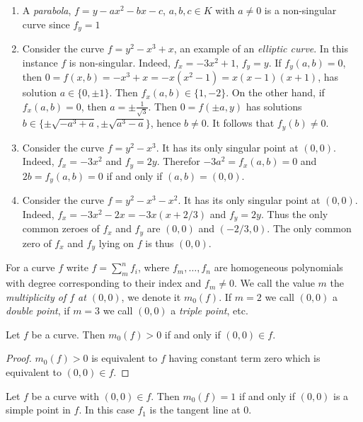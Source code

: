     \begin{example}
        \begin{enumerate}
            Each of the described curves will be in an algebraically closed field of characteristic $0$ (think $\C$).
            \item A \textit{parabola}, $f=y-ax^2-bx-c$, $a,b,c\in K$ with $a\neq 0$ is a non-singular curve since $f_y = 1$
            \item Consider the curve $f = y^2-x^3+x$, an example of an \textit{elliptic curve}. In this instance $f$ is non-singular. Indeed, $f_x = -3x^2+1$, $f_y = y$. If $f_y(a,b) = 0$, then $0=f(x,b)=-x^3+x=-x(x^2-1)=x(x-1)(x+1)$, has solution $a\in\{0,\pm 1\}$. Then $f_x(a,b)\in \{1,-2\}$. On the other hand, if $f_x(a,b)=0$, then $a=\pm \frac{1}{\sqrt{3}}$. Then $0=f(\pm a,y)$ has solutions $b\in \{\pm \sqrt{-a^3+a},\pm \sqrt{a^3-a}\}$, hence $b\neq 0$. It follows that $f_y(b)\neq 0$.
            \item Consider the curve $f = y^2-x^3$. It has its only singular point at $(0,0)$. Indeed, $f_x = -3x^2$ and $f_y = 2y$. Therefor $-3a^2=f_x(a,b)=0$ and $2b= f_y(a,b) =0$ if and only if $(a,b) = (0,0)$. 
            \item Consider the curve $f= y^2-x^3-x^2$. It has its only singular point at $(0,0)$. Indeed, $f_x = -3x^2-2x = -3x(x+2/3)$ and $f_y = 2y$. Thus the only common zeroes of $f_x$ and $f_y$ are $(0,0)$ and $(-2/3,0)$. The only common zero of $f_x$ and $f_y$ lying on $f$ is thus $(0,0)$. 
        \end{enumerate}
    \end{example}
    \begin{definition}
        For a curve $f$ write $f=\sum_m^n f_i$, where $f_m,\dots,f_n$ are homogeneous polynomials with degree corresponding to their index and $f_m\neq 0$. We call the value $m$ the \textit{multiplicity of $f$ at $(0,0)$}, we denote it $m_0(f)$. If $m=2$ we call $(0,0)$ a \textit{double point}, if $m=3$ we call $(0,0)$ a \textit{triple point}, etc. 
    \end{definition}
    \begin{lemma}
        Let $f$ be a curve. Then $m_0(f)>0$ if and only if $(0,0)\in f$. 
    \end{lemma}
    \begin{proof}
        $m_0(f)>0$ is equivalent to $f$ having constant term zero which is equivalent to $(0,0)\in f$. 
    \end{proof}
    \begin{lemma}\label{EquivalentFormulationOfSimplePoint}
        Let $f$ be a curve with $(0,0)\in f$. Then $m_0(f) = 1$ if and only if $(0,0)$ is a simple point in $f$. In this case $f_1$ is the tangent line at $0$.
    \end{lemma}
